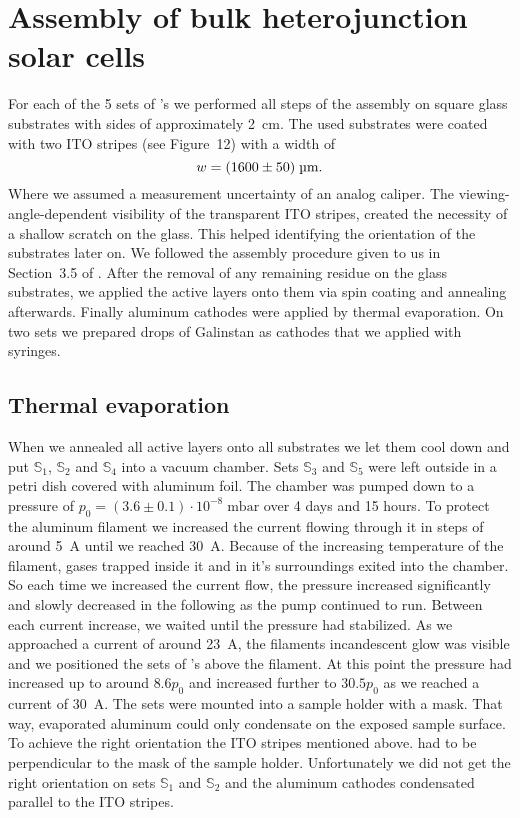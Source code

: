 \section{Assembly of bulk heterojunction solar cells}\label{sec:assembly}
For each of the 5 sets of \BHSC's we performed all steps of the assembly on square glass substrates with sides of approximately 2~cm. The used substrates were coated with two ITO stripes (see \cite{labdesc} Figure~12) with a width of
\begin{equation*}
w = (1600\pm50)\;\text{\textmu m}.
\end{equation*}
Where we assumed a measurement uncertainty of an analog caliper. The viewing-angle-dependent visibility of the transparent ITO stripes, created the necessity of a shallow scratch on the glass. This helped identifying the orientation of the substrates later on.\mypar
We followed the assembly procedure given to us in Section~3.5 of \cite{labdesc}. After the removal of any remaining residue on the glass substrates, we applied the active layers onto them via spin coating and annealing afterwards. Finally aluminum cathodes were applied by thermal evaporation. On two sets we prepared drops of Galinstan as cathodes that we applied with syringes.

\subsection{Thermal evaporation}
When we annealed all active layers onto all substrates we let them cool down and put $\mathbb{S}_1$, $\mathbb{S}_2$ and $\mathbb{S}_4$ into a vacuum chamber. Sets $\mathbb{S}_3$ and $\mathbb{S}_5$ were left outside in a petri dish covered with aluminum foil. The chamber was pumped down to a pressure of $p_0 = (3.6\pm 0.1)\cdot 10^{-8}\; \mathrm{mbar}$ over 4 days and 15 hours.\mypar
To protect the aluminum filament we increased the current flowing through it in steps of around 5~A until we reached 30~A. Because of the increasing temperature of the filament, gases trapped inside it and in it's surroundings exited into the chamber. So each time we increased the current flow, the pressure increased significantly and slowly decreased in the following as the pump continued to run. Between each current increase, we waited until the pressure had stabilized. As we approached a current of around 23~A, the filaments incandescent glow was visible and we positioned the sets of \BHSC's above the filament. At this point the pressure had increased up to around $8.6p_0$ and increased further to $30.5p_0$ as we reached a current of 30~A.\mypar
The sets were mounted into a sample holder with a mask. That way, evaporated aluminum could only condensate on the exposed sample surface. To achieve the right orientation the ITO stripes mentioned above. had to be perpendicular to the mask of the sample holder. Unfortunately we did not get the right orientation on sets $\mathbb{S}_1$ and $\mathbb{S}_2$ and the aluminum cathodes condensated parallel to the ITO stripes.

